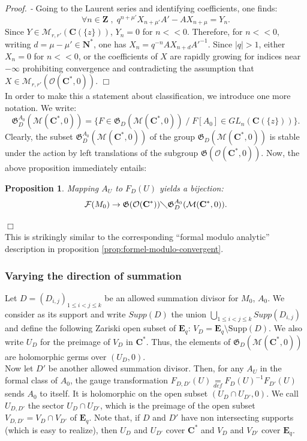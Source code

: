 \documentclass[english]{smfart}
\newtheorem{prop}[thm]{Proposition}
\numberwithin{equation}{thm}
\def \Pr {\textsl{Proof. - }}
\def\C{{\mathbf C}}
\def\Z{{\mathbf Z}}
\def\N{{\mathbf N}}
\def\F{{\mathcal{F}}}
\def\M{{\mathcal{M}}}
\def\Eq{{\mathbf{E}_{q}}}
\def\G{{\mathfrak{G}}}
\def\Ka{{\C(\{z\})}}
\def\Rw{{\mathcal{O}(\C^{*})}}
\def\Rwg{{\mathcal{O}(\C^{*},0)}}
\def\Kwg{{\mathcal{M}(\C^{*},0)}}
\begin{document}
\Pr 
Going to the Laurent series and identifying coefficients,
one finds:
$$
\forall n \in \Z \;,\; 
q^{n+\mu'} X_{n + \mu'} A' - A X_{n+\mu} = Y_{n}.
$$
Since $Y \in \M_{r,r'}(\Ka)$, $Y_{n} = 0$ for $n << 0$.
Therefore, for $n << 0$, writing $d = \mu - \mu' \in \N^{*}$,
one has $X_{n} = q^{-n} A X_{n+d} {A'}^{-1}.$ Since $|q| > 1$,
either $X_{n} = 0$ for $n << 0$, or the coefficients of $X$ are
rapidly growing for indices near $- \infty$ prohibiting convergence
and contradicting the assumption that $X \in \M_{r,r'}(\Rwg)$.
\hfill $\Box$ \\

In order to make this a statement about classification, we introduce
one more notation. We write:
$$
\G_{D}^{A_{0}}(\Kwg) = \{F \in \G_{D}(\Kwg) \;/\; F[A_{0}] \in GL_{n}(\Ka)\}.
$$
Clearly, the subset $\G_{D}^{A_{0}}(\Kwg)$ of the group $\G_{D}(\Kwg)$
is stable under the action by left translations of the subgroup $\G(\Rwg)$.
Now, the above proposition immediately entails:

\begin{prop}
Mapping $A_{U}$ to $F_{D}(U)$ yields a bijection:
$$
\F(M_{0}) \rightarrow \G(\Rw) \diagdown \G_{D}^{A_{0}}(\Kwg).
$$
\end{prop}
\hfill $\Box$ \\

This is strikingly similar to the corresponding ``formal modulo
analytic'' description in proposition \ref{prop:formel-modulo-convergent}.

\subsubsection*{Varying the direction of summation}

Let $D = (D_{i,j})_{1 \leq i < j \leq k}$ be an allowed summation 
divisor for $M_{0}$, $A_{0}$. We consider as its support and write
$Supp(D)$ the union $\underset{1 \leq i < j \leq k}{\bigcup} Supp(D_{i,j})$
and define the following Zariski open subset of $\Eq$:
$V_{D} = \Eq \setminus \text{Supp}(D)$. We also write $U_{D}$ for 
the preimage of $V_{D}$ in $\C^{*}$. Thus, the elements of $\G_{D}(\Kwg)$ are 
holomorphic germs over $(U_{D},0)$. \\

Now let $D'$ be another allowed summation divisor. Then, for any
$A_{U}$ in the formal class of $A_{0}$, the gauge transformation
$F_{D,D'}(U) \underset{def}{=} F_{D}(U)^{-1} F_{D'}(U)$ sends $A_{0}$ 
to itself. It is holomorphic on the open subset $(U_{D} \cap U_{D'},0)$. 
We call $U_{D,D'}$ the sector $U_{D} \cap U_{D'}$, which is the preimage 
of the open subset $V_{D,D'} = V_{D} \cap V_{D'}$ of $\Eq$. Note that,
if $D$ and $D'$ have non intersecting supports (which is easy to
realize), then $U_{D}$ and $U_{D'}$ cover $\C^{*}$ and $V_{D}$ and $V_{D'}$ 
cover $\Eq$.
\end{document}
